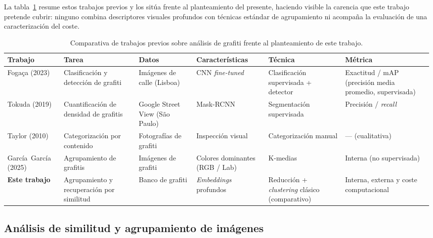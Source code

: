 La tabla~\ref{tab:art-comparativa} resume estos trabajos previos y los sitúa
frente al planteamiento del presente, haciendo visible la carencia que este
trabajo pretende cubrir: ninguno combina descriptores visuales profundos con
técnicas estándar de agrupamiento ni acompaña la evaluación de una
caracterización del coste.

\begin{table}[h]
\centering
\caption[Comparativa de trabajos previos sobre análisis de grafiti]{Comparativa de trabajos previos sobre análisis de grafiti frente al
planteamiento de este trabajo.}
\label{tab:art-comparativa}
{\scriptsize
\setlength{\tabcolsep}{3pt}
\begin{tabular}{|p{1.6cm}|p{1.9cm}|p{1.8cm}|p{2.0cm}|p{2.0cm}|p{1.5cm}|} \hline
  \textbf{Trabajo} & \textbf{Tarea} & \textbf{Datos} & \textbf{Características} & \textbf{Técnica} & \textbf{Métrica} \\ \hline
  Fogaça (2023) & Clasificación y detección de grafiti & Imágenes de calle (Lisboa) & CNN \textit{fine-tuned} & Clasificación supervisada + detector & Exactitud / mAP (precisión media promedio, supervisada) \\ \hline
  Tokuda (2019) & Cuantificación de densidad de grafitis & Google Street View (São Paulo) & Mask-RCNN & Segmentación supervisada & Precisión / \textit{recall} \\ \hline
  Taylor (2010) & Categorización por contenido & Fotografías de grafiti & Inspección visual & Categorización manual & --- (cualitativa) \\ \hline
  García~García (2025) & Agrupamiento de grafitis & Imágenes de grafiti & Colores dominantes (RGB / Lab) & K-medias & Interna (no supervisada) \\ \hline
  \textbf{Este trabajo} & Agrupamiento y recuperación por similitud & Banco de grafiti & \textit{Embeddings} profundos & Reducción + \textit{clustering} clásico (comparativo) & Interna, externa y coste computacional \\ \hline
\end{tabular}
}
\end{table}

\subsection{Análisis de similitud y agrupamiento de imágenes}
\label{subsec:art-emb-red-clus}

